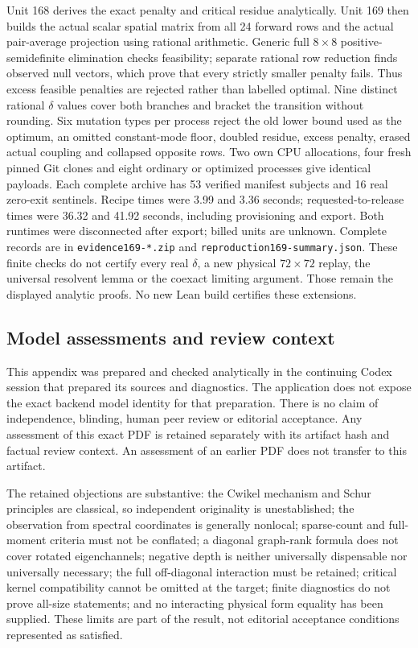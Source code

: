 \documentclass[11pt]{article}
\begin{document}
Unit 168 derives the exact penalty and critical residue analytically.
Unit 169 then builds the actual scalar spatial matrix from all 24 forward
rows and the actual pair-average projection using rational arithmetic.
Generic full $8\times8$ positive-semidefinite elimination checks feasibility;
separate rational row reduction finds observed null vectors, which prove
that every strictly smaller penalty fails. Thus excess feasible penalties
are rejected rather than labelled optimal. Nine distinct rational
$\delta$ values cover both branches and bracket the transition without
rounding. Six mutation types per process reject the old lower bound used
as the optimum, an omitted constant-mode floor, doubled residue, excess
penalty, erased actual coupling and collapsed opposite rows.
Two own CPU allocations, four fresh pinned Git clones and eight ordinary
or optimized processes give identical payloads. Each complete archive has
53 verified manifest subjects and 16 real zero-exit sentinels. Recipe times
were 3.99 and 3.36 seconds; requested-to-release times were 36.32 and
41.92 seconds, including provisioning and export. Both runtimes were
disconnected after export; billed units are unknown. Complete records are
in \texttt{evidence169-*.zip} and \texttt{reproduction169-summary.json}.
These finite checks do not certify every real $\delta$, a new physical
$72\times72$ replay, the universal resolvent lemma or the coexact limiting
argument. Those remain the displayed analytic proofs. No new Lean build
certifies these extensions.

\subsection{Model assessments and review context}
This appendix was prepared and checked analytically in the continuing Codex
session that prepared its sources and diagnostics. The application does not
expose the exact backend model identity for that preparation. There is no
claim of independence, blinding, human peer review or editorial acceptance.
Any assessment of this exact PDF is retained separately with its artifact hash and factual review context.
An assessment of an earlier PDF does not transfer to this artifact.

The retained objections are substantive: the Cwikel mechanism and Schur
principles are classical, so independent originality is unestablished; the
observation from spectral coordinates is generally nonlocal; sparse-count
and full-moment criteria must not be conflated; a diagonal graph-rank formula
does not cover rotated eigenchannels; negative depth is neither universally
dispensable nor universally necessary; the full off-diagonal interaction must
be retained; critical kernel compatibility cannot be omitted at the target; finite diagnostics do not prove all-size statements; and no
interacting physical form equality has been supplied. These limits are part
of the result, not editorial acceptance conditions represented as satisfied.
\end{document}
